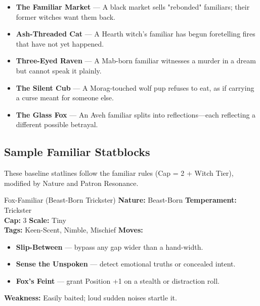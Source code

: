 \documentclass[11pt]{book}
\begin{document}
\begin{itemize}[leftmargin=1.5em]
    \item \textbf{The Familiar Market} --- A black market sells "rebonded" familiars; their former witches want them back.
    \item \textbf{Ash-Threaded Cat} --- A Hearth witch's familiar has begun foretelling fires that have not yet happened.
    \item \textbf{Three-Eyed Raven} --- A Mab-born familiar witnesses a murder in a dream but cannot speak it plainly.
    \item \textbf{The Silent Cub} --- A Morag-touched wolf pup refuses to eat, as if carrying a curse meant for someone else.
    \item \textbf{The Glass Fox} --- An Aveh familiar splits into reflections---each reflecting a different possible betrayal.
\end{itemize}

\subsection{Sample Familiar Statblocks}
\label{sec:familiar-statblocks}

These baseline statlines follow the familiar rules (Cap = 2 + Witch Tier),
modified by Nature and Patron Resonance.

\begin{creaturebox}{Fox-Familiar (Beast-Born Trickster)}
\textbf{Nature:} Beast-Born \quad \textbf{Temperament:} Trickster  \\
\textbf{Cap:} 3 \quad \textbf{Scale:} Tiny \\
\textbf{Tags:} Keen-Scent, Nimble, Mischief  
\textbf{Moves:}
\begin{itemize}[leftmargin=1.5em, noitemsep]
    \item \textbf{Slip-Between} --- bypass any gap wider than a hand-width.
    \item \textbf{Sense the Unspoken} --- detect emotional truths or concealed intent.
    \item \textbf{Fox's Feint} --- grant Position +1 on a stealth or distraction roll.
\end{itemize}
\textbf{Weakness:} Easily baited; loud sudden noises startle it.
\end{creaturebox}
\end{document}
